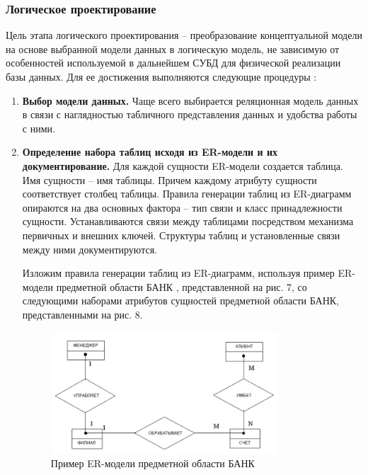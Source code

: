 \subsubsection{Логическое  проектирование}

Цель этапа логического проектирования – преобразование концептуальной модели на основе выбранной модели данных
в логическую модель, не зависимую от особенностей используемой в дальнейшем СУБД для физической реализации базы
данных. Для ее достижения выполняются следующие процедуры \autocite{design-db_6}:
\begin{enumerate}
    \item \textbf{Выбор модели данных.}
        Чаще всего выбирается реляционная модель данных в связи с наглядностью табличного представления данных
        и удобства работы с ними.

    \item \textbf{Определение набора таблиц исходя из ER-модели и их документирование.}
        Для каждой сущности ER-модели создается таблица. Имя сущности – имя таблицы. Причем каждому атрибуту
        сущности соответствует столбец таблицы. Правила генерации таблиц из ER-диаграмм опираются на два основных
        фактора – тип связи и класс принадлежности сущности. Устанавливаются связи между таблицами посредством
        механизма первичных и внешних ключей. Структуры таблиц и установленные связи между ними документируются.

        Изложим правила генерации таблиц из ER-диаграмм, используя пример ER-модели предметной
        области БАНК \autocite{BANK}, представленной на рис. 7, со следующими наборами атрибутов сущностей предметной области БАНК,
        представленными на рис. 8.

    \begin{figure}[H]
        \centering
        \includegraphics[width=0.8\textwidth]{assets/security/pic2.png}
        \caption{Пример ER-модели предметной области БАНК}
        \label{fig:mesh04}
    \end{figure}


\end{enumerate}
